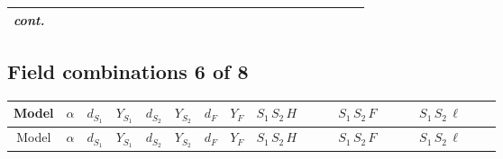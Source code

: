 \documentclass[8pt]{article}
\begin{document}
\begin{landscape}
\begin{longtable}{@{}cccccccc >{\raggedright\arraybackslash}p{0.21\linewidth} >{\raggedright\arraybackslash}p{0.21\linewidth} >{\raggedright\arraybackslash}p{0.21\linewidth}@{}}
\textit{cont.} &  &  &  &  &  &  &  &  &  & \scriptsize\adjustbox{max width=\linewidth}{$\begin{gathered} +\frac{\hbar  \overline{y_{2,i_1,r_1}} \overline{Y_{e,i_3,i_2}} \overline{e_{i_2}}\, P_L\, L_{a_1,i_1} y_{2,i_3,r_1} H_{a_1}{}^{\dagger }}{4 \epsilon } \\ +\frac{3}{8} \hbar  \overline{y_{2,i_1,r_1}} \overline{Y_{e,i_3,i_2}} \overline{e_{i_2}}\, P_L\, L_{a_1,i_1} y_{2,i_3,r_1} H_{a_1}{}^{\dagger }\end{gathered}$} \\
\midrule
\bottomrule
\end{longtable}
\clearpage
\subsection*{Field combinations 6 of 8}
\begin{longtable}{@{}cccccccc >{\raggedright\arraybackslash}p{0.21\linewidth} >{\raggedright\arraybackslash}p{0.21\linewidth} >{\raggedright\arraybackslash}p{0.21\linewidth}@{}}
\toprule
Model & $\alpha$ & $d_{S_1}$ & $Y_{S_1}$ & $d_{S_2}$ & $Y_{S_2}$ & $d_F$ & $Y_F$ & $S_1\,S_2\,H$ & $S_1\,S_2\,F$ & $S_1\,S_2\,\ell$ \\
\midrule
\endfirsthead
\toprule
Model & $\alpha$ & $d_{S_1}$ & $Y_{S_1}$ & $d_{S_2}$ & $Y_{S_2}$ & $d_F$ & $Y_F$ & $S_1\,S_2\,H$ & $S_1\,S_2\,F$ & $S_1\,S_2\,\ell$ \\
\midrule
\endhead

\end{longtable}
\end{landscape}
\end{document}
